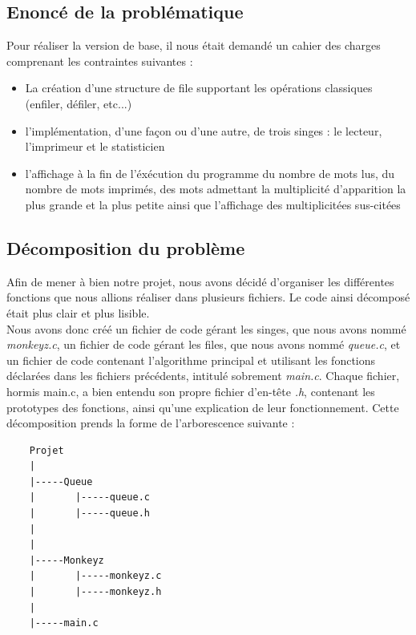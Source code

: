 \documentclass{article}
\begin{document}
\subsection{Enoncé de la problématique}
Pour réaliser la version de base, il nous était demandé un cahier des charges comprenant les contraintes suivantes : 
\begin{itemize}
    \item La création d'une structure de file supportant les opérations classiques (enfiler, défiler, etc...)
    \item l'implémentation, d'une façon ou d'une autre, de trois singes : le lecteur, l'imprimeur et le statisticien
    \item l'affichage à la fin de l'éxécution du programme du nombre de mots lus, du nombre de mots imprimés, des mots admettant la multiplicité d'apparition la plus grande et la plus petite ainsi que l'affichage des multiplicitées sus-citées
\end{itemize}
\subsection{Décomposition du problème}
Afin de mener à bien notre projet, nous avons décidé d'organiser les différentes fonctions que nous allions réaliser dans plusieurs fichiers. Le code ainsi décomposé était plus clair et plus lisible.\\
Nous avons donc créé un fichier de code gérant les singes, que nous avons nommé \emph{monkeyz.c}, un fichier de code gérant les files, que nous avons nommé \emph{queue.c}, et un fichier de code contenant l'algorithme principal et  utilisant les fonctions déclarées dans les fichiers précédents, intitulé sobrement \emph{main.c}. Chaque fichier, hormis main.c, a bien entendu son propre fichier d'en-tête \emph{.h}, contenant les prototypes des fonctions, ainsi qu'une explication de leur fonctionnement.
Cette décomposition prends la forme de l'arborescence suivante :
\begin{verbatim}
    Projet
    |
    |-----Queue
    |       |-----queue.c
    |       |-----queue.h
    |
    |
    |-----Monkeyz
    |       |-----monkeyz.c
    |       |-----monkeyz.h
    |
    |-----main.c
\end{verbatim}
\newpage
\end{document}
